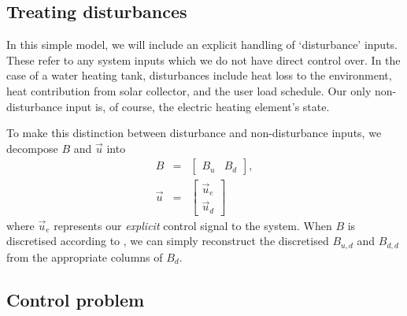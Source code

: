 \subsection{Treating disturbances}

In this simple model, we will include an explicit handling of `disturbance' inputs.
These refer to any system inputs which we do not have direct control over.
In the case of a water heating tank, disturbances include heat loss to the environment, heat contribution from solar collector, and the user load schedule.
Our only non-disturbance input is, of course, the electric heating element's state.

To make this distinction between disturbance and non-disturbance inputs, we decompose $B$ and $\vec{u}$ into
\begin{eqnarray}
	B &=& \left[\begin{array}{cc}
		B_u & B_d
	\end{array}\right], \\
	\vec{u} &=& \left[\begin{array}{c}
		\vec{u}_e \\ \vec{u}_d
	\end{array}\right]
\end{eqnarray}
where $\vec{u}_e$ represents our \emph{explicit} control signal to the system.
When $B$ is discretised according to , we can simply reconstruct the discretised $B_{u, d}$ and $B_{d, d}$ from the appropriate columns of $B_d$.

\subsection{Control problem}


